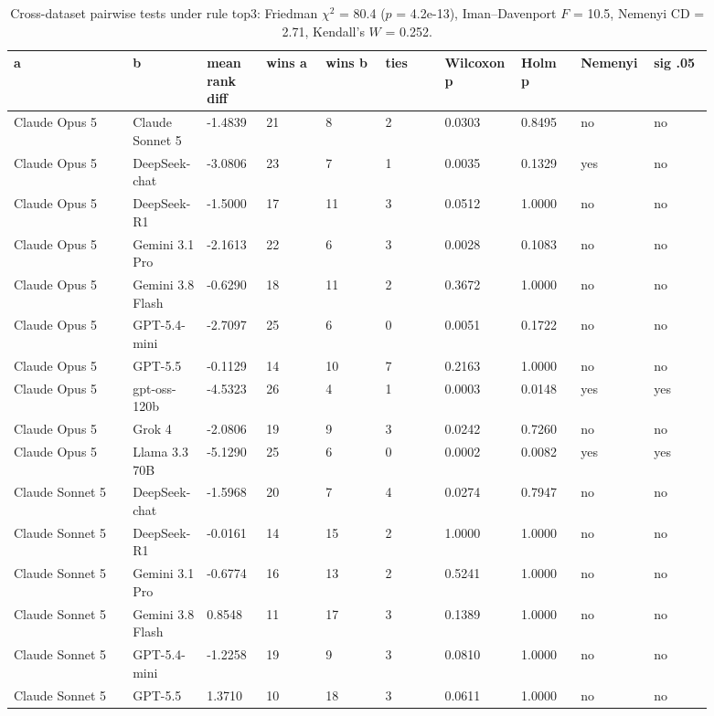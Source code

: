 \begin{landscape}
\tiny
\setlength{\tabcolsep}{3pt}
\begin{longtable}{p{0.162\linewidth}p{0.081\linewidth}p{0.081\linewidth}p{0.081\linewidth}p{0.081\linewidth}p{0.081\linewidth}p{0.081\linewidth}p{0.081\linewidth}p{0.081\linewidth}p{0.081\linewidth}}
\caption{Cross-dataset pairwise tests under rule top3: Friedman $\chi^2$ = 80.4 ($p$ = 4.2e-13), Iman--Davenport $F$ = 10.5, Nemenyi CD = 2.71, Kendall's $W$ = 0.252.}\label{tab:pairwise_top3}\\
\toprule
a & b & mean rank diff & wins a & wins b & ties & Wilcoxon p & Holm p & Nemenyi & sig .05 \\
\midrule
Claude Opus 5 & Claude Sonnet 5 & -1.4839 & 21 & 8 & 2 & 0.0303 & 0.8495 & no & no \\
Claude Opus 5 & DeepSeek-chat & -3.0806 & 23 & 7 & 1 & 0.0035 & 0.1329 & yes & no \\
Claude Opus 5 & DeepSeek-R1 & -1.5000 & 17 & 11 & 3 & 0.0512 & 1.0000 & no & no \\
Claude Opus 5 & Gemini 3.1 Pro & -2.1613 & 22 & 6 & 3 & 0.0028 & 0.1083 & no & no \\
Claude Opus 5 & Gemini 3.8 Flash & -0.6290 & 18 & 11 & 2 & 0.3672 & 1.0000 & no & no \\
Claude Opus 5 & GPT-5.4-mini & -2.7097 & 25 & 6 & 0 & 0.0051 & 0.1722 & no & no \\
Claude Opus 5 & GPT-5.5 & -0.1129 & 14 & 10 & 7 & 0.2163 & 1.0000 & no & no \\
Claude Opus 5 & gpt-oss-120b & -4.5323 & 26 & 4 & 1 & 0.0003 & 0.0148 & yes & yes \\
Claude Opus 5 & Grok 4 & -2.0806 & 19 & 9 & 3 & 0.0242 & 0.7260 & no & no \\
Claude Opus 5 & Llama 3.3 70B & -5.1290 & 25 & 6 & 0 & 0.0002 & 0.0082 & yes & yes \\
Claude Sonnet 5 & DeepSeek-chat & -1.5968 & 20 & 7 & 4 & 0.0274 & 0.7947 & no & no \\
Claude Sonnet 5 & DeepSeek-R1 & -0.0161 & 14 & 15 & 2 & 1.0000 & 1.0000 & no & no \\
Claude Sonnet 5 & Gemini 3.1 Pro & -0.6774 & 16 & 13 & 2 & 0.5241 & 1.0000 & no & no \\
Claude Sonnet 5 & Gemini 3.8 Flash & 0.8548 & 11 & 17 & 3 & 0.1389 & 1.0000 & no & no \\
Claude Sonnet 5 & GPT-5.4-mini & -1.2258 & 19 & 9 & 3 & 0.0810 & 1.0000 & no & no \\
Claude Sonnet 5 & GPT-5.5 & 1.3710 & 10 & 18 & 3 & 0.0611 & 1.0000 & no & no \\

\end{longtable}
\end{landscape}
